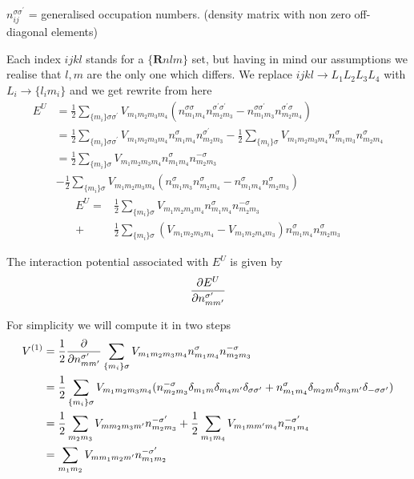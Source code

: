 $n_{ij}^{\sigma\sigma^\prime}$ = generalised occupation numbers. (density matrix with non zero off-diagonal elements)\\
\par{Each index $ijkl$ stands for a $ \lbrace \bm{R}nlm \rbrace $ set, but having in mind our assumptions we realise
that $l,m$ are the only one which differs. We replace ${ijkl} \rightarrow {L_1L_2L_3L_4}$ with $L_i \rightarrow \lbrace l_im_i \rbrace$ and we get}
rewrite from here
\begin{equation*}
\begin{split}
E^U&=\frac{1}{2}\sum_{\{m_i\}\sigma\sigma^\prime}V_{m_1m_2m_3m_4}
(n_{m_1m_4}^{\sigma\sigma}n_{m_2m_3}^{\sigma^\prime\sigma^\prime}-
n_{m_1m_3}^{\sigma\sigma^\prime}n_{m_2m_4}^{\sigma^\prime\sigma})\\
&=\frac{1}{2}\sum_{\{m_i\}\sigma\sigma^\prime}V_{m_1m_2m_3m_4}
n_{m_1m_4}^{\sigma}n_{m_2m_3}^{\sigma^\prime}-\frac{1}{2}\sum_{\{m_i\}\sigma}V_{m_1m_2m_3m_4}
n_{m_1m_3}^{\sigma}n_{m_2m_4}^{\sigma}\\
&=\frac{1}{2}\sum_{\{m_i\}\sigma}V_{m_1m_2m_3m_4}n_{m_1m_4}^{\sigma}n_{m_2m_3}^{-\sigma}\\&-
\frac{1}{2}\sum_{\{m_i\}\sigma}V_{m_1m_2m_3m_4}
(n_{m_1m_3}^{\sigma}n_{m_2m_4}^{\sigma}-n_{m_1m_4}^{\sigma}n_{m_2m_3}^{\sigma})
\end{split}
\end{equation*}
\begin{equation}
\label{Eu}
\begin{split}
E^U=&\frac{1}{2}\sum_{\{m_i\}\sigma}V_{m_1m_2m_3m_4}n_{m_1m_4}^{\sigma}n_{m_2m_3}^{-\sigma}\\+&
\frac{1}{2}\sum_{\{m_i\}\sigma}(V_{m_1m_2m_3m_4}-V_{m_1m_2m_4m_3})
n_{m_1m_4}^{\sigma}n_{m_2m_3}^{\sigma}
\end{split}
\end{equation}
%
\par{The interaction potential associated with $E^U$ is given by}
\begin{equation*}
\frac{\partial E^U}{\partial n_{mm^\prime}^{\sigma^\prime}}
\end{equation*}
%
\par{For simplicity we will compute it in two steps}
%
\begin{equation}
\begin{split}
V^{(1)}&=\frac{1}{2}\frac{\partial }{\partial n_{mm^\prime}^{\sigma^\prime}}\sum_{\{m_i\}\sigma}V_{m_1m_2m_3m_4}n_{m_1m_4}^{\sigma}n_{m_2m_3}^{-\sigma}\\
&=\frac{1}{2}\sum_{\{m_i\}\sigma}V_{m_1m_2m_3m_4}(n_{m_2m_3}^{-\sigma}\delta_{m_1m}\delta_{m_4m^\prime}\delta_{\sigma\sigma^\prime}
+n_{m_1m_4}^{\sigma}\delta_{m_2m}\delta_{m_3m^\prime}\delta_{-\sigma\sigma^\prime})\\
&=\frac{1}{2}\sum_{m_2m_3}V_{mm_2m_3m^{\prime}}n_{m_2m_3}^{-\sigma^{\prime}}
+\frac{1}{2}\sum_{m_1m_4}V_{m_1mm^{\prime}m_4}n_{m_1m_4}^{-\sigma^{\prime}}\\
&=\sum_{m_1m_2}V_{mm_1m_2m^{\prime}}n_{m_1m_2}^{-\sigma^{\prime}}
\end{split}
\end{equation}
